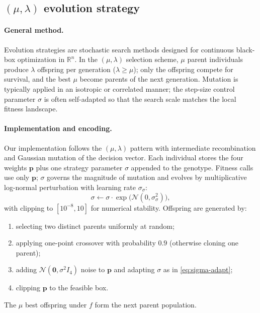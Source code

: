 \documentclass[pdflatex,sn-mathphys-num]{sn-jnl}
\begin{document}
\subsection{$(\mu,\lambda)$ evolution strategy}\label{subsec:es}

\paragraph{General method.}
Evolution strategies are stochastic search methods designed for continuous black-box optimization in $\mathbb{R}^n$.
In the $(\mu,\lambda)$ selection scheme, $\mu$ parent individuals produce $\lambda$ offspring per generation ($\lambda\ge\mu$); only the offspring compete for survival, and the best $\mu$ become parents of the next generation.
Mutation is typically applied in an isotropic or correlated manner; the step-size control parameter $\sigma$ is often self-adapted so that the search scale matches the local fitness landscape.

\paragraph{Implementation and encoding.}
Our implementation follows the $(\mu,\lambda)$ pattern with intermediate recombination and Gaussian mutation of the decision vector.
Each individual stores the four weights $\mathbf{p}$ plus one strategy parameter $\sigma$ appended to the genotype.
Fitness calls use only $\mathbf{p}$; $\sigma$ governs the magnitude of mutation and evolves by multiplicative log-normal perturbation with learning rate $\sigma_\sigma$:
\begin{equation}
  \sigma \leftarrow \sigma \cdot \exp\!\bigl(\mathcal{N}(0,\sigma_\sigma^2)\bigr),
  \label{eq:sigma-adapt}
\end{equation}
with clipping to $[10^{-8},10]$ for numerical stability.
Offspring are generated by:
\begin{enumerate}
  \item selecting two distinct parents uniformly at random;
  \item applying one-point crossover with probability $0.9$ (otherwise cloning one parent);
  \item adding $\mathcal{N}(\mathbf{0},\sigma^2 I_4)$ noise to $\mathbf{p}$ and adapting $\sigma$ as in \eqref{eq:sigma-adapt};
  \item clipping $\mathbf{p}$ to the feasible box.
\end{enumerate}
The $\mu$ best offspring under $f$ form the next parent population.
\end{document}
